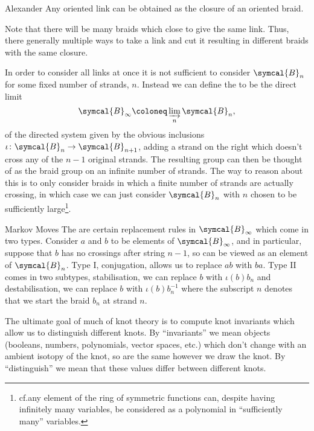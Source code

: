 \documentclass[fleqn]{NotesClass}
\newcommand{\braid}{\symcal{B}}
\begin{document}
    \begin{thm}{Alexander}{}
        Any oriented link can be obtained as the closure of an oriented braid.
    \end{thm}
    
    Note that there will be many braids which close to give the same link.
    Thus, there generally multiple ways to take a link and cut it resulting in different braids with the same closure.
    
    In order to consider all links at once it is not sufficient to consider \(\braid_n\) for some fixed number of strands, \(n\).
    Instead we can define the  to be the direct limit
    \begin{equation}
        \braid_{\infty} \coloneq \varinjlim_n \braid_n,
    \end{equation}
    of the directed system given by the obvious inclusions \(\iota \colon \braid_n \to \braid_{n+1}\), adding a strand on the right which doesn't cross any of the \(n-1\) original strands.
    The resulting group can then be thought of as the braid group on an infinite number of strands.
    The way to reason about this is to only consider braids in which a finite number of strands are actually crossing, in which case we can just consider \(\braid_n\) with \(n\) chosen to be sufficiently large\footnote{cf.\@ any element of the ring of symmetric functions can, despite having infinitely many variables, be considered as a polynomial in \enquote{sufficiently many} variables.}.
    
    \begin{dfn}{Markov Moves}{}
        The  are certain replacement rules in \(\braid_{\infty}\) which come in two types.
        Consider \(a\) and \(b\) to be elements of \(\braid_{\infty}\), and in particular, suppose that \(b\) has no crossings after string \(n-1\), so can be viewed as an element of \(\braid_n\).
        Type I, conjugation, allows us to replace \(ab\) with \(ba\).
        Type II comes in two subtypes, stabilisation, we can replace \(b\) with \(\iota(b)b_n\) and destabilisation, we can replace \(b\) with \(\iota(b)b_n^{-1}\) where the subscript \(n\) denotes that we start the braid \(b_n\) at strand \(n\).
    \end{dfn}
    
    The ultimate goal of much of knot theory is to compute knot invariants which allow us to distinguish different knots.
    By \enquote{invariants} we mean objects (booleans, numbers, polynomials, vector spaces, etc.) which don't change with an ambient isotopy of the knot, so are the same however we draw the knot.
    By \enquote{distinguish} we mean that these values differ between different knots.
    
\end{document}
